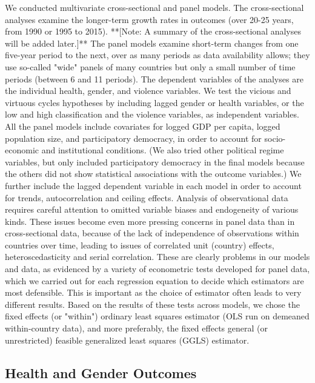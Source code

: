 \documentclass[12pt]{article}
\begin{document}

We conducted multivariate cross-sectional and panel models. The cross-sectional analyses examine the longer-term growth rates in outcomes (over 20-25 years, from 1990 or 1995 to 2015). **[Note: A summary of the cross-sectional analyses will be added later.]**
The panel models examine short-term changes from one five-year period to the next, over as many periods as data availability allows; they use so-called "wide" panels of many countries but only a small number of time periods (between 6 and 11 periods). The dependent variables of the analyses are the individual health, gender, and violence variables. We test the vicious and virtuous cycles hypotheses by including lagged gender or health variables, or the low and high classification and the violence variables, as independent variables. All the panel models include covariates for logged GDP per capita, logged population size, and participatory democracy, in order to account for socio-economic and institutional conditions. (We also tried other political regime variables, but only included participatory democracy in the final models because the others did not show statistical associations with the outcome variables.) We further include the lagged dependent variable in each model in order to account for trends, autocorrelation and ceiling effects.
Analysis of observational data requires careful attention to omitted variable biases and endogeneity of various kinds. These issues become even more pressing concerns in panel data than in cross-sectional data, because of the lack of independence of observations within countries over time, leading to issues of correlated unit (country) effects, heteroscedasticity and serial correlation. These are clearly problems in our models and data, as evidenced by a variety of econometric tests developed for panel data, which we carried out for each regression equation to decide which estimators are most defensible. This is important as the choice of estimator often leads to very different results. Based on the results of these tests across models, we chose the fixed effects (or "within") ordinary least squares estimator (OLS run on demeaned within-country data), and more preferably, the fixed effects general (or unrestricted) feasible generalized least squares (GGLS) estimator.

\subsection{Health and Gender Outcomes}
\end{document}
